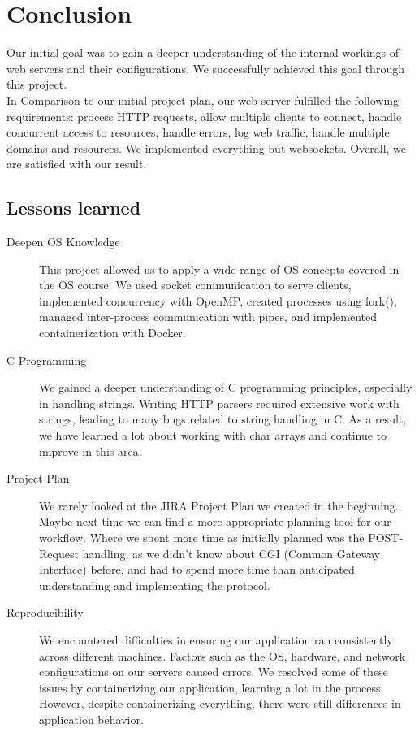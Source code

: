 \section*{Conclusion}
Our initial goal was to gain a deeper understanding of the internal workings of web servers and their configurations. We successfully achieved this goal through this project. \\
In Comparison to our initial project plan, our web server fulfilled the following requirements: process HTTP requests, allow multiple clients to connect, handle concurrent access to resources, handle errors, log web traffic, handle multiple domains and resources. We implemented everything but websockets. Overall, we are satisfied with our result.


\subsection*{Lessons learned}
\begin{description}
    \item[Deepen OS Knowledge] This project allowed us to apply a wide range of OS concepts covered in the OS course. We used socket communication to serve clients, implemented concurrency with OpenMP, created processes using fork(), managed inter-process communication with pipes, and implemented containerization with Docker.
    \item[C Programming] We gained a deeper understanding of C programming principles, especially in handling strings. Writing HTTP parsers required extensive work with strings, leading to many bugs related to string handling in C. As a result, we have learned a lot about working with char arrays and continue to improve in this area.
    \item[Project Plan]We rarely looked at the JIRA Project Plan we created in the beginning. Maybe next time we can find a more appropriate planning tool for our workflow.
    Where we spent more time as initially planned was the POST-Request handling, as we didn't know about CGI (Common Gateway Interface) before, and had to spend more time than anticipated understanding and implementing the protocol. 
    \item[Reproducibility]We encountered difficulties in ensuring our application ran consistently across different machines. Factors such as the OS, hardware, and network configurations on our servers caused errors. We resolved some of these issues by containerizing our application, learning a lot in the process. However, despite containerizing everything, there were still differences in application behavior.
\end{description}


